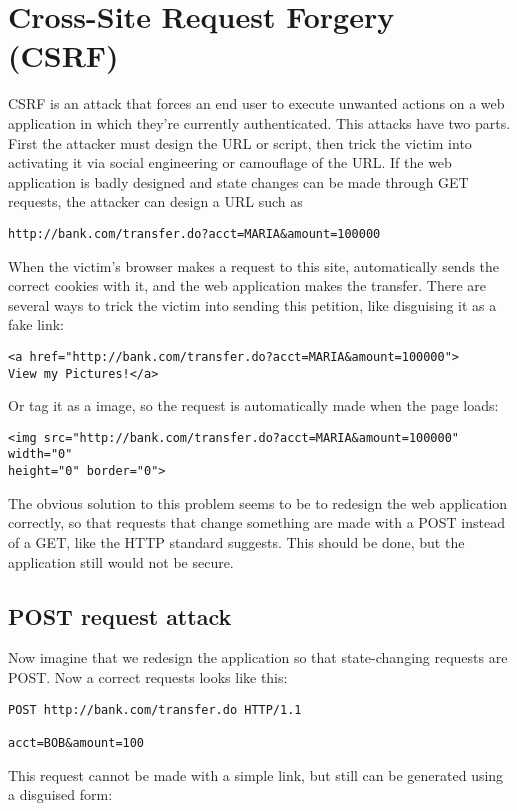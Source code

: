 \section{Cross-Site Request Forgery (CSRF)}
CSRF is an attack that forces an end user to execute unwanted actions on a web application in which they're currently authenticated. This attacks have two parts. First the attacker must design the URL or script, then trick the victim into activating it via social engineering or camouflage of the URL. If the web application is badly designed and state changes can be made through GET requests, the attacker can design a URL such as

\begin{lstlisting}[style=verbs]
http://bank.com/transfer.do?acct=MARIA&amount=100000
\end{lstlisting}
When the victim's browser makes a request to this site, automatically sends the correct cookies with it, and the web application makes the transfer. There are several ways to trick the victim into sending this petition, like disguising it as a fake link: 

\begin{lstlisting}[style=verbs]
<a href="http://bank.com/transfer.do?acct=MARIA&amount=100000">
View my Pictures!</a>
\end{lstlisting}
Or tag it as a image, so the request is automatically made when the page loads:
\begin{lstlisting}[style=verbs]
<img src="http://bank.com/transfer.do?acct=MARIA&amount=100000" width="0" 
height="0" border="0">
\end{lstlisting} 
The obvious solution to this problem seems to be to redesign the web application correctly, so that requests that change something are made with a POST instead of a GET, like the HTTP standard suggests. This should be done, but the application still would not be secure.

\subsection{POST request attack}
Now imagine that we redesign the application so that state-changing requests are POST. Now a correct requests looks like this:
\begin{lstlisting}[style=verbs]
POST http://bank.com/transfer.do HTTP/1.1

acct=BOB&amount=100
\end{lstlisting}
This request cannot be made with a simple link, but still can be generated using a disguised form:

